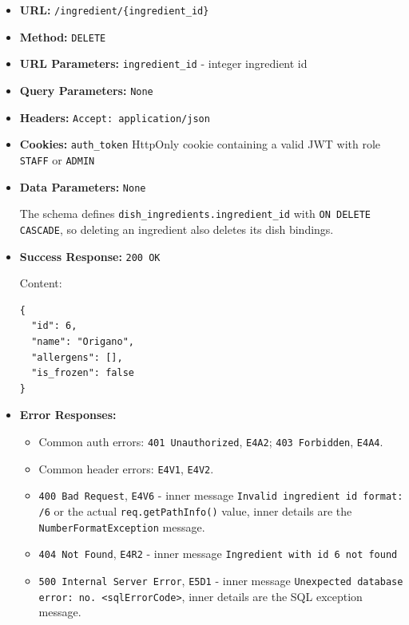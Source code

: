 \begin{itemize}[nosep]
\item \textbf{URL:} \texttt{/ingredient/\{ingredient\_id\}}

\item \textbf{Method:} \texttt{DELETE}

\item \textbf{URL Parameters:} \texttt{ingredient\_id} - integer ingredient id

\item \textbf{Query Parameters:} \texttt{None}

\item \textbf{Headers:} \texttt{Accept: application/json}

\item \textbf{Cookies:} \texttt{auth\_token} HttpOnly cookie containing a valid JWT with role \texttt{STAFF} or \texttt{ADMIN}

\item \textbf{Data Parameters:} \texttt{None}

The schema defines \texttt{dish\_ingredients.ingredient\_id} with \texttt{ON DELETE CASCADE}, so deleting an ingredient also deletes its dish bindings.

\item \textbf{Success Response:} \texttt{200 OK}

Content:

\begin{lstlisting}
{
  "id": 6,
  "name": "Origano",
  "allergens": [],
  "is_frozen": false
}
\end{lstlisting}

\item \textbf{Error Responses:}

\begin{itemize}[nosep]
\item Common auth errors: \texttt{401 Unauthorized}, \texttt{E4A2}; \texttt{403 Forbidden}, \texttt{E4A4}.
\item Common header errors: \texttt{E4V1}, \texttt{E4V2}.
\item \texttt{400 Bad Request}, \texttt{E4V6} - inner message \texttt{Invalid ingredient id format: /6} or the actual \texttt{req.getPathInfo()} value, inner details are the \texttt{NumberFormatException} message.
\item \texttt{404 Not Found}, \texttt{E4R2} - inner message \texttt{Ingredient with id 6 not found}
\item \texttt{500 Internal Server Error}, \texttt{E5D1} - inner message \texttt{Unexpected database error: no. <sqlErrorCode>}, inner details are the SQL exception message.
\end{itemize}

\end{itemize}

